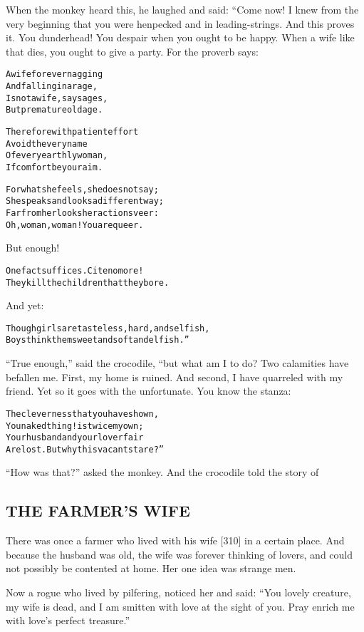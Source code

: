 \documentclass{article}
\renewenvironment{verbatim}{\begin{alltt}\normalfont\begin{centering}}{\end{centering}\end{alltt}}
\begin{document}
When the monkey heard this, he laughed and said: “Come now! I knew
from the very beginning that you were henpecked and in
leading-strings. And this proves it. You dunderhead! You despair
when you ought to be happy. When a wife like that dies, you ought
to give a party. For the proverb says:

\begin{verbatim}
A wife forever nagging
    And falling in a rage,
Is not a wife, say sages,
    But premature old age.

Therefore with patient effort
    Avoid the very name
Of every earthly woman,
    If comfort be your aim.

For what she feels, she does not say;
She speaks and looks a different way;
Far from her looks her actions veer:
Oh, woman, woman! You are queer.
\end{verbatim}
But enough!

\begin{verbatim}
One fact suffices. Cite no more!
They kill the children that they bore.
\end{verbatim}
And yet:

\begin{verbatim}
Though girls are tasteless, hard, and selfish,
Boys think them sweet and soft and elfish.”
\end{verbatim}
``True enough,'' said the crocodile, “but what am I to do? Two
calamities have befallen me. First, my home is ruined. And second,
I have quarreled with my friend. Yet so it goes with the
unfortunate. You know the stanza:

\begin{verbatim}
The cleverness that you have shown,
You naked thing! is twice my own;
Your husband and your lover fair
Are lost. But why this vacant stare?”
\end{verbatim}
``How was that?'' asked the monkey. And the crocodile told the
story of

\subsection{THE FARMER'S WIFE}

There was once a farmer who lived with his wife [310] in a certain
place. And because the husband was old, the wife was forever
thinking of lovers, and could not possibly be contented at home.
Her one idea was strange men.

Now a rogue who lived by pilfering, noticed her and said:
``You lovely creature, my wife is dead, and I am smitten with love at the sight of you. Pray enrich me with love's perfect treasure.''
\end{document}
